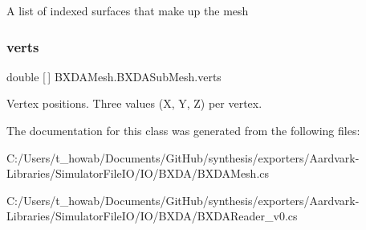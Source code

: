 A list of indexed surfaces that make up the mesh 

\mbox{\label{class_b_x_d_a_mesh_1_1_b_x_d_a_sub_mesh_a9380db1d5b44c04010de0d21a9dac79e}} 
\subsubsection{\texorpdfstring{verts}{verts}}
{\footnotesize\ttfamily double \mbox{[}$\,$\mbox{]} B\+X\+D\+A\+Mesh.\+B\+X\+D\+A\+Sub\+Mesh.\+verts}



Vertex positions. Three values (X, Y, Z) per vertex. 



The documentation for this class was generated from the following files\+:\begin{DoxyCompactItemize}
\item 
C\+:/\+Users/t\+\_\+howab/\+Documents/\+Git\+Hub/synthesis/exporters/\+Aardvark-\/\+Libraries/\+Simulator\+File\+I\+O/\+I\+O/\+B\+X\+D\+A/B\+X\+D\+A\+Mesh.\+cs\item 
C\+:/\+Users/t\+\_\+howab/\+Documents/\+Git\+Hub/synthesis/exporters/\+Aardvark-\/\+Libraries/\+Simulator\+File\+I\+O/\+I\+O/\+B\+X\+D\+A/B\+X\+D\+A\+Reader\+\_\+v0.\+cs\end{DoxyCompactItemize}
